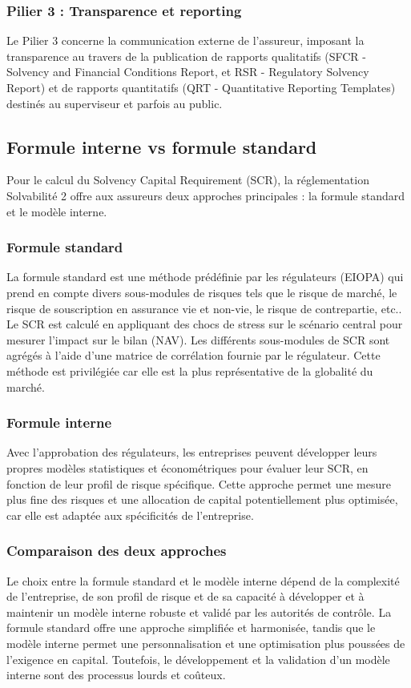 \subsubsection{Pilier 3 : Transparence et reporting}
Le Pilier 3 concerne la communication externe de l'assureur, imposant la transparence au travers de la publication de rapports qualitatifs (SFCR - Solvency and Financial Conditions Report, et RSR - Regulatory Solvency Report) et de rapports quantitatifs (QRT - Quantitative Reporting Templates) destinés au superviseur et parfois au public.

\subsection{Formule interne vs formule standard}
Pour le calcul du Solvency Capital Requirement (SCR), la réglementation Solvabilité 2 offre aux assureurs deux approches principales : la formule standard et le modèle interne.

\subsubsection{Formule standard}
La formule standard est une méthode prédéfinie par les régulateurs (EIOPA) qui prend en compte divers sous-modules de risques tels que le risque de marché, le risque de souscription en assurance vie et non-vie, le risque de contrepartie, etc.. Le SCR est calculé en appliquant des chocs de stress sur le scénario central pour mesurer l'impact sur le bilan (NAV). Les différents sous-modules de SCR sont agrégés à l'aide d'une matrice de corrélation fournie par le régulateur. Cette méthode est privilégiée car elle est la plus représentative de la globalité du marché.

\subsubsection{Formule interne}
Avec l'approbation des régulateurs, les entreprises peuvent développer leurs propres modèles statistiques et économétriques pour évaluer leur SCR, en fonction de leur profil de risque spécifique. Cette approche permet une mesure plus fine des risques et une allocation de capital potentiellement plus optimisée, car elle est adaptée aux spécificités de l'entreprise.

\subsubsection{Comparaison des deux approches}
Le choix entre la formule standard et le modèle interne dépend de la complexité de l'entreprise, de son profil de risque et de sa capacité à développer et à maintenir un modèle interne robuste et validé par les autorités de contrôle. La formule standard offre une approche simplifiée et harmonisée, tandis que le modèle interne permet une personnalisation et une optimisation plus poussées de l'exigence en capital. Toutefois, le développement et la validation d'un modèle interne sont des processus lourds et coûteux.

